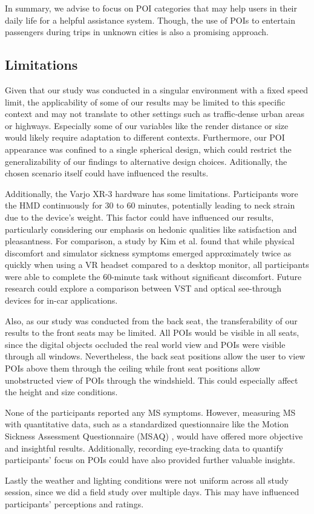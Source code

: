 In summary, we advise to focus on POI categories that may help users in their daily life for a helpful assistance system. Though, the use of POIs to entertain passengers during trips in unknown cities is also a promising approach.


\subsection{Limitations}
Given that our study was conducted in a singular environment with a fixed speed limit, the applicability of some of our results may be limited to this specific context and may not translate to other settings such as traffic-dense urban areas or highways. Especially some of our variables like the render distance or size would likely require adaptation to different contexts. Furthermore, our POI appearance was confined to a single spherical design, which could restrict the generalizability of our findings to alternative design choices. Aditionally, the chosen scenario itself could have influenced the results.

Additionally, the Varjo XR-3 hardware has some limitations. Participants wore the HMD continuously for 30 to 60 minutes, potentially leading to neck strain due to the device's weight. This factor could have influenced our results, particularly considering our emphasis on hedonic qualities like satisfaction and pleasantness. For comparison, a study by Kim et al. \cite{kim2021Discomfort} found that while physical discomfort and simulator sickness symptoms emerged approximately twice as quickly when using a VR headset compared to a desktop monitor, all participants were able to complete the 60-minute task without significant discomfort. Future research could explore a comparison between VST and optical see-through devices for in-car applications.

Also, as our study was conducted from the back seat, the transferability of our results to the front seats may be limited. All POIs would be visible in all seats, since the digital objects occluded the real world view and POIs were visible through all windows. Nevertheless, the back seat positions allow the user to view POIs above them through the ceiling while front seat positions allow unobstructed view of POIs through the windshield. This could especially affect the height and size conditions.

None of the participants reported any MS symptoms. However, measuring MS with quantitative data, such as a standardized questionnaire like the Motion Sickness Assessment Questionnaire (MSAQ) \cite{gianaros2001MSAQ}, would have offered more objective and insightful results. Additionally, recording eye-tracking data to quantify participants' focus on POIs could have also provided further valuable insights.

Lastly the weather and lighting conditions were not uniform across all study session, since we did a field study over multiple days. This may have influenced participants' perceptions and ratings.
